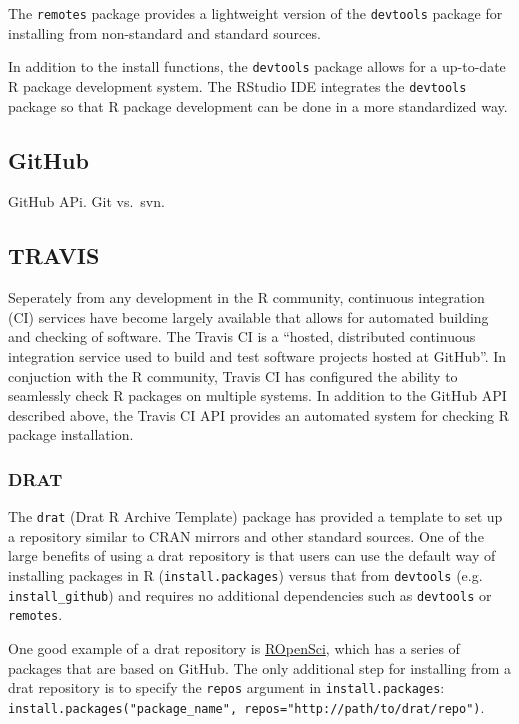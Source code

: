 \documentclass[]{elsarticle} %
\begin{document}
The \texttt{remotes} package provides a lightweight version of the
\texttt{devtools} package for installing from non-standard and standard
sources.

In addition to the install functions, the \texttt{devtools} package
allows for a up-to-date R package development system. The RStudio IDE
integrates the \texttt{devtools} package so that R package development
can be done in a more standardized way.

\subsection{GitHub}\label{github}

GitHub APi. Git vs.~svn.

\subsection{TRAVIS}\label{travis}

Seperately from any development in the R community, continuous
integration (CI) services have become largely available that allows for
automated building and checking of software. The Travis CI is a
``hosted, distributed continuous integration service used to build and
test software projects hosted at GitHub''. In conjuction with the R
community, Travis CI has configured the ability to seamlessly check R
packages on multiple systems. In addition to the GitHub API described
above, the Travis CI API provides an automated system for checking R
package installation.

\subsubsection{DRAT}\label{drat}

The \texttt{drat} (Drat R Archive Template) package has provided a
template to set up a repository similar to CRAN mirrors and other
standard sources. One of the large benefits of using a drat repository
is that users can use the default way of installing packages in R
(\texttt{install.packages}) versus that from \texttt{devtools} (e.g.
\texttt{install\_github}) and requires no additional dependencies such
as \texttt{devtools} or \texttt{remotes}.

One good example of a drat repository is
\href{https://ropensci.org/}{ROpenSci}, which has a series of packages
that are based on GitHub. The only additional step for installing from a
drat repository is to specify the \texttt{repos} argument in
\texttt{install.packages}:
\texttt{install.packages("package\_name",\ repos="http://path/to/drat/repo")}.
\end{document}
